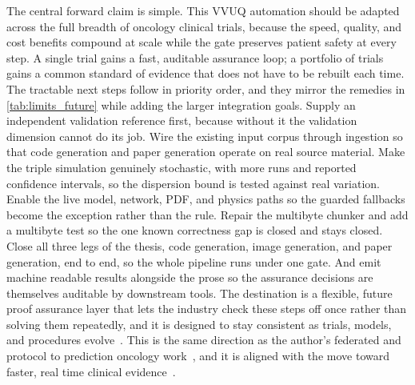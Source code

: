 The central forward claim is simple. This VVUQ automation should be adapted across
the full breadth of oncology clinical trials, because the speed, quality, and cost
benefits compound at scale while the gate preserves patient safety at every step.
A single trial gains a fast, auditable assurance loop; a portfolio of trials gains
a common standard of evidence that does not have to be rebuilt each time. The
tractable next steps follow in priority order, and they mirror the remedies in
\autoref{tab:limits_future} while adding the larger integration goals. Supply an
independent validation reference first, because without it the validation
dimension cannot do its job. Wire the existing input corpus through ingestion so
that code generation and paper generation operate on real source material.
Make the triple simulation genuinely stochastic, with more runs and reported
confidence intervals, so the dispersion bound is tested against real variation.
Enable the live model, network, PDF, and physics paths so the guarded fallbacks
become the exception rather than the rule. Repair the multibyte chunker and add a
multibyte test so the one known correctness gap is closed and stays closed. Close
all three legs of the thesis, code generation, image generation, and paper
generation, end to end, so the whole pipeline runs under one gate. And emit
machine readable results alongside the prose so the assurance decisions are
themselves auditable by downstream tools. The destination is a flexible, future
proof assurance layer that lets the industry check these steps off once rather
than solving them repeatedly, and it is designed to stay consistent as trials,
models, and procedures evolve~\cite{repo-cancer-automated, sel2025vvuq}. This is
the same direction as the author's federated and protocol to prediction oncology
work~\cite{kawchak2026federated, kawchak2025qsppdac}, and it is aligned with the
move toward faster, real time clinical evidence~\cite{fda2026realtime}.
